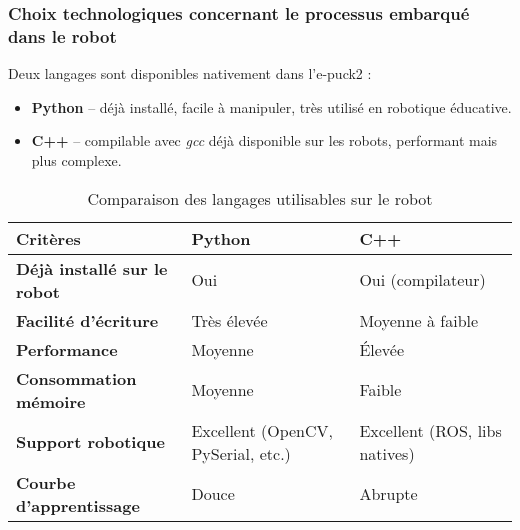 \subsubsection{Choix technologiques concernant le processus embarqué dans le robot} \label{sec:choix_robot}
Deux langages sont disponibles nativement dans l'e-puck2 :
\begin{itemize}
    \item \textbf{Python} – déjà installé, facile à manipuler, très utilisé en robotique éducative.
    \item \textbf{C++} – compilable avec \textit{gcc} déjà disponible sur les robots, performant mais plus complexe.
\end{itemize}

\begin{longtable}[H]{|p{}|p{}|p{}|}
\caption{\label{tab:comparison_robot_languages} Comparaison des langages utilisables sur le robot} \\

\hline
\textbf{Critères} & \textbf{Python} & \textbf{C++} \\
\endfirsthead

\hline
\textbf{Déjà installé sur le robot} & Oui & Oui (compilateur) \\
\hline
\textbf{Facilité d’écriture} & Très élevée & Moyenne à faible \\
\hline
\textbf{Performance} & Moyenne & Élevée \\
\hline
\textbf{Consommation mémoire} & Moyenne & Faible \\
\hline
\textbf{Support robotique} & Excellent (OpenCV, PySerial, etc.) & Excellent (ROS, libs natives) \\
\hline
\textbf{Courbe d’apprentissage} & Douce & Abrupte \\
\hline
\end{longtable}
